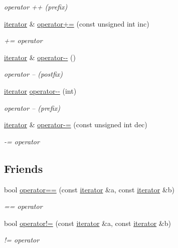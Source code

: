 \begin{DoxyCompactItemize}
\begin{DoxyCompactList}\small\item\em operator ++ (prefix) \end{DoxyCompactList}\item 
\hyperlink{classnVect_1_1iterator}{iterator} \& \hyperlink{classnVect_1_1iterator_abece3b68bb91a0397f58bbdac7996724}{operator+=} (const unsigned int inc)
\begin{DoxyCompactList}\small\item\em += operator \end{DoxyCompactList}\item 
\hyperlink{classnVect_1_1iterator}{iterator} \& \hyperlink{classnVect_1_1iterator_a65e426d74204084e00d8d6770b88b790}{operator-\/-\/} ()
\begin{DoxyCompactList}\small\item\em operator -- (postfix) \end{DoxyCompactList}\item 
\hyperlink{classnVect_1_1iterator}{iterator} \hyperlink{classnVect_1_1iterator_aa99d3a05bc566f235dcc06c3b57e21d3}{operator-\/-\/} (int)
\begin{DoxyCompactList}\small\item\em operator -- (prefix) \end{DoxyCompactList}\item 
\hyperlink{classnVect_1_1iterator}{iterator} \& \hyperlink{classnVect_1_1iterator_a1dc00f521ea60257023cd95a1e9238dd}{operator-\/=} (const unsigned int dec)
\begin{DoxyCompactList}\small\item\em -\/= operator \end{DoxyCompactList}\end{DoxyCompactItemize}
\subsection*{Friends}
\begin{DoxyCompactItemize}
\item 
bool \hyperlink{classnVect_1_1iterator_a81d10d7799462c7ca5e7cf19119ca356}{operator==} (const \hyperlink{classnVect_1_1iterator}{iterator} \&a, const \hyperlink{classnVect_1_1iterator}{iterator} \&b)
\begin{DoxyCompactList}\small\item\em == operator \end{DoxyCompactList}\item 
bool \hyperlink{classnVect_1_1iterator_a55a8ee0e80dad1a7da9d751c25bc0386}{operator!=} (const \hyperlink{classnVect_1_1iterator}{iterator} \&a, const \hyperlink{classnVect_1_1iterator}{iterator} \&b)
\begin{DoxyCompactList}\small\item\em != operator \end{DoxyCompactList}\end{DoxyCompactItemize}


